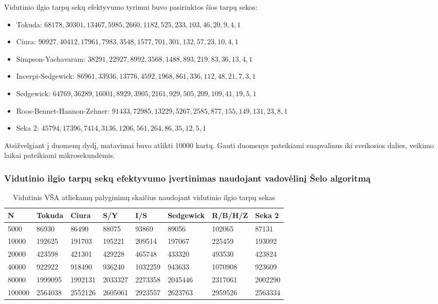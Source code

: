 \documentclass{VUMIFInfKursinis}
\begin{document}
Vidutinio ilgio tarpų sekų efektyvumo tyrimui buvo pasirinktos šios tarpų sekos:
\begin{itemize}
  \item Tokuda: $68178,30301,13467,5985,2660,1182,525,233,103,46,20,9,4,1$
  \item Ciura: $90927,40412,17961,7983,3548,1577,701,301,132,57,23,10,4,1$
  \item Simpson-Yachavaram: $38291,22927,8992,3568,1488,893,219,83,36,13,4,1$
  \item Incerpi-Sedgewick: $86961,33936,13776,4592,1968,861,336,112,48,21,7,3,1$
  \item Sedgewick: $64769,36289,16001,8929,3905,2161,929,505,209,109,41,19,5,1$
  \item Roos-Bennet-Hannon-Zehner: $91433,72985,13229,5267,2585,877,155,149,131,23,8,1$
  \item Seka 2: $45794,17396,7414,3136,1206,561,264,86,35,12,5,1$
\end{itemize}

Atsižvelgiant į duomenų dydį, matavimai buvo atlikti 10000 kartų.
Gauti duomenys pateikiami suapvalinus iki sveikosios dalies, veikimo laikai pateikiami mikrosekundėmis.

\subsubsection{Vidutinio ilgio tarpų sekų efektyvumo įvertinimas naudojant vadovėlinį Šelo algoritmą}

\begin{table}[H]
  \caption{Vidutinis VŠA atliekamų palyginimų skaičius naudojant vidutinio ilgio tarpų sekas}
  \begin{tabular}{|l|l|l|l|l|l|l|l|}
  \hline
  N      & Tokuda  & Ciura   & S/Y     & I/S     & Sedgewick & R/B/H/Z & Seka 2     \\ \hline
  5000   & 86930   & 86490   & 88075   & 93869   & 89056     & 102065  & 87131   \\ \hline
  10000  & 192625  & 191703  & 195221  & 209514  & 197067    & 225459  & 193092  \\ \hline
  20000  & 423598  & 421301  & 429228  & 465748  & 433320    & 493530  & 423824  \\ \hline
  40000  & 922922  & 918490  & 936240  & 1032259 & 943633    & 1070908 & 923609  \\ \hline
  80000  & 1999095 & 1992131 & 2033327 & 2273358 & 2045446   & 2317061 & 2002290 \\ \hline
  100000 & 2564038 & 2552126 & 2605061 & 2923557 & 2623763   & 2959526 & 2563334 \\ \hline
  \end{tabular}
\end{table}
\end{document}
